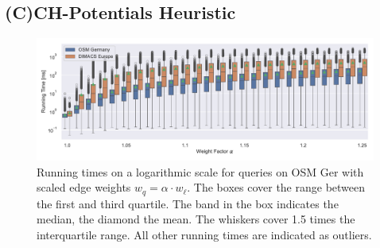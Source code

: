 \documentclass[manuscript,review]{acmart}
\begin{document}


\subsection{(C)CH-Potentials Heuristic}

\begin{figure}
\centering
\includegraphics[width=\linewidth]{fig/scaled_weights.pdf}
\caption{
Running times on a logarithmic scale for queries on OSM Ger with scaled edge weights $w_q = \alpha \cdot w_\ell$.
The boxes cover the range between the first and third quartile.
The band in the box indicates the median, the diamond the mean.
The whiskers cover 1.5 times the interquartile range.
All other running times are indicated as outliers.
}\label{fig:scaled_weights}
\end{figure}
\end{document}

